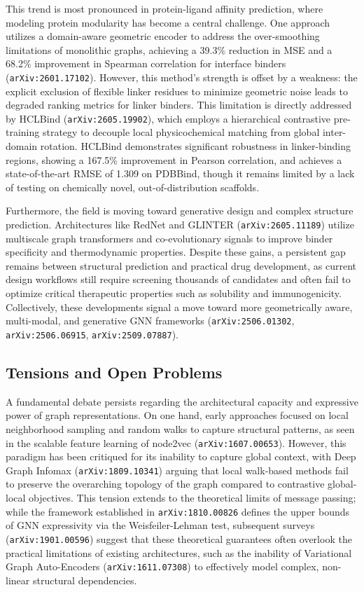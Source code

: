 \documentclass[11pt]{article}
\begin{document}
This trend is most pronounced in protein-ligand affinity prediction, where modeling protein modularity has become a central challenge. One approach utilizes a domain-aware geometric encoder to address the over-smoothing limitations of monolithic graphs, achieving a 39.3\% reduction in MSE and a 68.2\% improvement in Spearman correlation for interface binders (\texttt{arXiv:2601.17102}). However, this method’s strength is offset by a weakness: the explicit exclusion of flexible linker residues to minimize geometric noise leads to degraded ranking metrics for linker binders. This limitation is directly addressed by HCLBind (\texttt{arXiv:2605.19902}), which employs a hierarchical contrastive pre-training strategy to decouple local physicochemical matching from global inter-domain rotation. HCLBind demonstrates significant robustness in linker-binding regions, showing a 167.5\% improvement in Pearson correlation, and achieves a state-of-the-art RMSE of 1.309 on PDBBind, though it remains limited by a lack of testing on chemically novel, out-of-distribution scaffolds.

Furthermore, the field is moving toward generative design and complex structure prediction. Architectures like RedNet and GLINTER (\texttt{arXiv:2605.11189}) utilize multiscale graph transformers and co-evolutionary signals to improve binder specificity and thermodynamic properties. Despite these gains, a persistent gap remains between structural prediction and practical drug development, as current design workflows still require screening thousands of candidates and often fail to optimize critical therapeutic properties such as solubility and immunogenicity. Collectively, these developments signal a move toward more geometrically aware, multi-modal, and generative GNN frameworks (\texttt{arXiv:2506.01302}, \texttt{arXiv:2506.06915}, \texttt{arXiv:2509.07887}).

\subsection{Tensions and Open Problems}

A fundamental debate persists regarding the architectural capacity and expressive power of graph representations. On one hand, early approaches focused on local neighborhood sampling and random walks to capture structural patterns, as seen in the scalable feature learning of node2vec (\texttt{arXiv:1607.00653}). However, this paradigm has been critiqued for its inability to capture global context, with Deep Graph Infomax (\texttt{arXiv:1809.10341}) arguing that local walk-based methods fail to preserve the overarching topology of the graph compared to contrastive global-local objectives. This tension extends to the theoretical limits of message passing; while the framework established in \texttt{arXiv:1810.00826} defines the upper bounds of GNN expressivity via the Weisfeiler-Lehman test, subsequent surveys (\texttt{arXiv:1901.00596}) suggest that these theoretical guarantees often overlook the practical limitations of existing architectures, such as the inability of Variational Graph Auto-Encoders (\texttt{arXiv:1611.07308}) to effectively model complex, non-linear structural dependencies.
\end{document}
